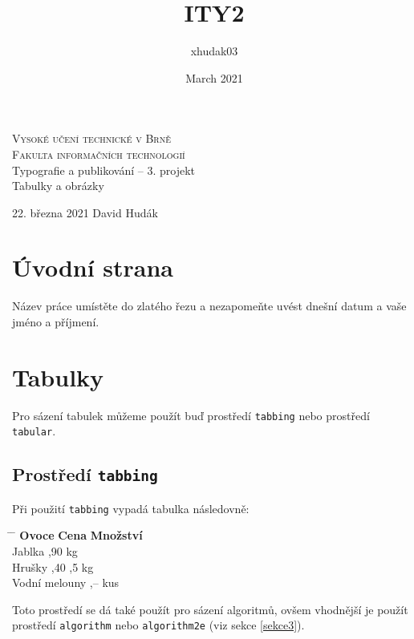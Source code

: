 \documentclass[11pt, a4paper]{article}
\title{ITY2}
\author{xhudak03}
\date{March 2021}
\begin{document}
\begin{titlepage}
\begin{center}
{\Huge
\textsc{Vysoké učení technické v Brně\huge{\\[0.4em]Fakulta informačních technologií}}}\\
\LARGE
Typografie a publikování -- 3. projekt\\[0.3em]\Huge Tabulky a obrázky
\end{center}
{\LARGE 22. března 2021 \hfill
David Hudák}
\thispagestyle{empty}
\end{titlepage}

\clearpage
{} 
\newpage

\section{Úvodní strana}

Název práce umístěte do zlatého řezu a nezapomeňte uvést dnešní datum a vaše jméno a příjmení.

\section{Tabulky}
Pro sázení tabulek můžeme použít buď prostředí \verb|tabbing| nebo prostředí \verb|tabular|.

\subsection{Prostředí \texttt{tabbing}}
Při použití \verb|tabbing| vypadá tabulka následovně:

\begin{tabbing}
    \hspace{1in} \= \hspace{0.45in} \= \hspace{0.5in}\kill 
     \textbf{Ovoce} \>\textbf{Cena} \quad\>\textbf{Množství}  \\
     Jablka ,90  kg \\
     Hrušky ,40 ,5 kg \\
     Vodní melouny ,–  kus
\end{tabbing}
Toto prostředí se dá také použít pro sázení algoritmů, ovšem vhodnější je použít 
prostředí \verb|algorithm| nebo \verb|algorithm2e| (viz sekce \ref{sekce3}).

\setlength{\skip\footins}{1cm}
\end{document}
